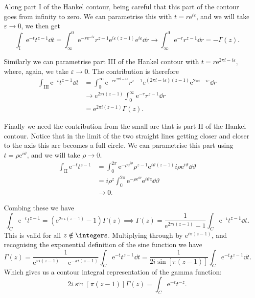 \documentclass[fleqn]{NotesClass}
\newcommand*{\e}{\mathrm{e}}
\begin{document}
    Along part I of the Hankel contour, being careful that this part of the contour goes from infinity to zero.
    We can parametrise this with \(t = r\e^{i\varepsilon}\), and we will take \(\varepsilon \to 0\), we then get
    \begin{equation}
        \int_{\mathrm{I}} \e^{-t}t^{z-1}\dd{t} = \int_{\infty}^{0} \e^{-r\e^{-i\varepsilon}}r^{z-1}\e^{i\varepsilon(z-1)} \e^{i\varepsilon} \dd{r} \to \int_{\infty}^{0} \e^{-r}r^{z-1} \dd{r} = -\Gamma(z).
    \end{equation}
    
    Similarly we can parametrise part III of the Hankel contour with \(t = r\e^{2\pi i - i\varepsilon}\), where, again, we take \(\varepsilon \to 0\).
    The contribution is therefore
    \begin{align}
        \int_{\mathrm{III}} \e^{-t}t^{z-1}\dd{t} &= \int_{0}^{\infty} \e^{-r\e^{2\pi i - i\varepsilon}}r^{z-1}\e^{(2\pi i - i\varepsilon)(z - 1)}\e^{2\pi i - i\varepsilon}\dd{r}\\
        &\to \e^{2\pi i(z - 1)}\int_{0}^{\infty} \e^{-r}r^{z-1} \dd{r}\\
        &= \e^{2\pi i(z - 1)}\Gamma(z).
    \end{align}
    
    Finally we need the contribution from the small arc that is part II of the Hankel contour.
    Notice that in the limit of the two straight lines getting closer and closer to the axis this arc becomes a full circle.
    We can parametrise this part using \(t = \rho\e^{i\vartheta}\), and we will take \(\rho \to 0\).
    \begin{align}
        \int_{\mathrm{II}} \e^{-t}t^{z - 1} &= \int_{0}^{2\pi} \e^{-\rho\e^{i\vartheta}}\rho^{z-1}\e^{i\vartheta(z - 1)}i\rho\e^{i\vartheta}\dd{\vartheta}\\
        &= i\rho^{z}\int_{0}^{2\pi}\e^{-\rho\e^{i\vartheta}}\e^{i\vartheta z}\dd{\vartheta}\\
        &\to 0.
    \end{align}
    
    Combing these we have
    \begin{equation}
        \int_C \e^{-t}t^{z-1} = (\e^{2\pi i(z - 1)} - 1)\Gamma(z) \implies \Gamma(z) = \frac{1}{\e^{2\pi i (z - 1)} - 1} \int_C \e^{-t}t^{z-1}\dd{t}.
    \end{equation}
    This is valid for all \(z \notin \integers\).
    Multiplying through by \(\e^{i\pi(z-1)}\), and recognising the exponential definition of the sine function we have
    \begin{equation}
        \Gamma(z) = \frac{1}{\e^{\pi i(z - 1)} - \e^{-\pi i(z-1)}}\int_C\e^{-t}t^{z-1}\dd{t} = \frac{1}{2i\sin[\pi(z - 1)]}\int_C\e^{-t}t^{z-1}\dd{t}.
    \end{equation}
    Which gives us a contour integral representation of the gamma function:
    \begin{equation}
        2 i\sin[\pi(z - 1)] \Gamma(z) = \int_C \e^{-t}t^{-z}.
    \end{equation} 
    
\end{document}
